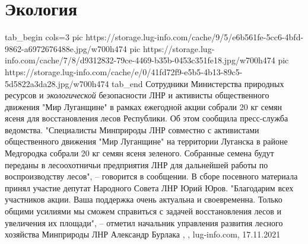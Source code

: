  
 
 
 
 
\chapter{Экология}
\label{sec:slova.ekologia}

\ifcmt
  tab_begin cols=3
     pic https://storage.lug-info.com/cache/9/5/e6b561fe-5cc6-4bfd-9862-a6972676488e.jpg/w700h474
     pic https://storage.lug-info.com/cache/7/8/d9312832-79ce-4469-b35b-0453c351fe18.jpg/w700h474
		 pic https://storage.lug-info.com/cache/e/0/41fd72f9-e5b5-4b13-89c5-5d5822a3da28.jpg/w700h474
  tab_end
\fi
Сотрудники Министерства природных ресурсов и \emph{экологической} безопасности
ЛНР и активисты общественного движения "Мир Луганщине" в рамках ежегодной акции
собрали 20 кг семян ясеня для восстановления лесов Республики. Об этом сообщила
пресс-служба ведомства.  "Специалисты Минприроды ЛНР совместно с активистами
общественного движения "Мир Луганщине" на территории Луганска в районе
Медгородка собрали 20 кг семян ясеня зеленого. Собранные семена будут переданы
в лесоохотничьи предприятия ЛНР для дальнейшей работы по воспроизводству
лесов", – говорится в сообщении.  В сборе посевного материала принял участие
депутат Народного Совета ЛНР Юрий Юров.  "Благодарим всех участников акции.
Ваша поддержка очень актуальна и своевременна. Только общими усилиями мы сможем
справиться с задачей восстановления лесов и увеличения их площади", – отметил
начальник управления развития лесного хозяйства Минприроды ЛНР Александр
Бурлака
, 
, lug-info.com, 17.11.2021
